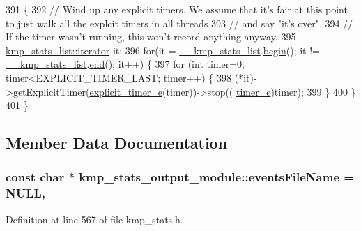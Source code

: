 \begin{DoxyCode}
391 \{
392     \textcolor{comment}{// Wind up any explicit timers. We assume that it's fair at this point to just walk all the explcit
       timers in all threads }
393     \textcolor{comment}{// and say "it's over".}
394     \textcolor{comment}{// If the timer wasn't running, this won't record anything anyway.}
395     \hyperlink{classkmp__stats__list_1_1iterator}{kmp\_stats\_list::iterator} it;
396     \textcolor{keywordflow}{for}(it = \hyperlink{kmp__global_8c_a4ce412fd3335747984f4b5d8fa62cb98}{\_\_kmp\_stats\_list}.\hyperlink{classkmp__stats__list_af688afb91e7dab63d4b1005d8c2d858e}{begin}(); it != 
      \hyperlink{kmp__global_8c_a4ce412fd3335747984f4b5d8fa62cb98}{\_\_kmp\_stats\_list}.\hyperlink{classkmp__stats__list_ad0ae8a080fec141c81d3e3454d25c99b}{end}(); it++) \{
397         \textcolor{keywordflow}{for} (\textcolor{keywordtype}{int} timer=0; timer<EXPLICIT\_TIMER\_LAST; timer++) \{
398             (*it)->getExplicitTimer(\hyperlink{kmp__stats_8h_a295442cccb9777c926d7b3addc83cce6}{explicit\_timer\_e}(timer))->stop((
      \hyperlink{kmp__stats_8h_ae03f1e0ff609f86afa9b7167a12c6c06}{timer\_e})timer);
399         \}
400     \}
401 \}
\end{DoxyCode}


\subsection{Member Data Documentation}
\hypertarget{classkmp__stats__output__module_abeb05f889265a698f6d82f1a66f0ea6d}{
\subsubsection[{events\-File\-Name}]{\setlength{\rightskip}{0pt plus 5cm}const char $\ast$ kmp\-\_\-stats\-\_\-output\-\_\-module\-::events\-File\-Name = N\-U\-L\-L\hspace{0.3cm}{\ttfamily [static]}, {\ttfamily [private]}}}\label{classkmp__stats__output__module_abeb05f889265a698f6d82f1a66f0ea6d}


Definition at line 567 of file kmp\-\_\-stats.\-h.

